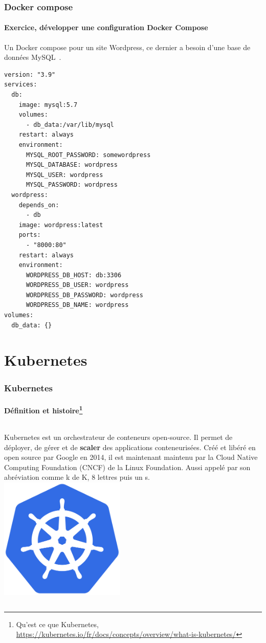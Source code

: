\documentclass{beamer}
\begin{document}
    \begin{frame}[fragile]
        \transdissolve
        \frametitle{Docker compose}
        \framesubtitle{Exercice, développer une configuration Docker Compose}
        Un Docker compose pour un site Wordpress, ce dernier a besoin d'une base de données MySQL~.
        \pause
        \begin{lstlisting}[basicstyle=\ttfamily\tiny]
version: "3.9"
services:
  db:
    image: mysql:5.7
    volumes:
      - db_data:/var/lib/mysql
    restart: always
    environment:
      MYSQL_ROOT_PASSWORD: somewordpress
      MYSQL_DATABASE: wordpress
      MYSQL_USER: wordpress
      MYSQL_PASSWORD: wordpress
  wordpress:
    depends_on:
      - db
    image: wordpress:latest
    ports:
      - "8000:80"
    restart: always
    environment:
      WORDPRESS_DB_HOST: db:3306
      WORDPRESS_DB_USER: wordpress
      WORDPRESS_DB_PASSWORD: wordpress
      WORDPRESS_DB_NAME: wordpress
volumes:
  db_data: {}
        \end{lstlisting}
    \end{frame}


    \section{Kubernetes}\label{sec:kubernetes}

    \begin{frame}
        \transdissolve
        \frametitle{Kubernetes}
        \framesubtitle{Définition et histoire\footnote{Qu'est ce que Kubernetes, \url{https://kubernetes.io/fr/docs/concepts/overview/what-is-kubernetes/}}}
        \begin{columns}
            Kubernetes est un orchestrateur de conteneurs open-source.
            Il permet de déployer, de gérer et de \textbf{scaler} des applications conteneurisées.
            \bigbreak
            Créé et libéré en open source par Google en 2014, il est maintenant maintenu par la Cloud Native Computing Foundation (CNCF) de la Linux Foundation.
            \bigbreak
            Aussi appelé par son abréviation  comme k de K, 8 lettres puis un s.
            \centering
            \includegraphics[width=6cm]{image/kubernetes-logo.png}
        \end{columns}
    \end{frame}
\end{document}
